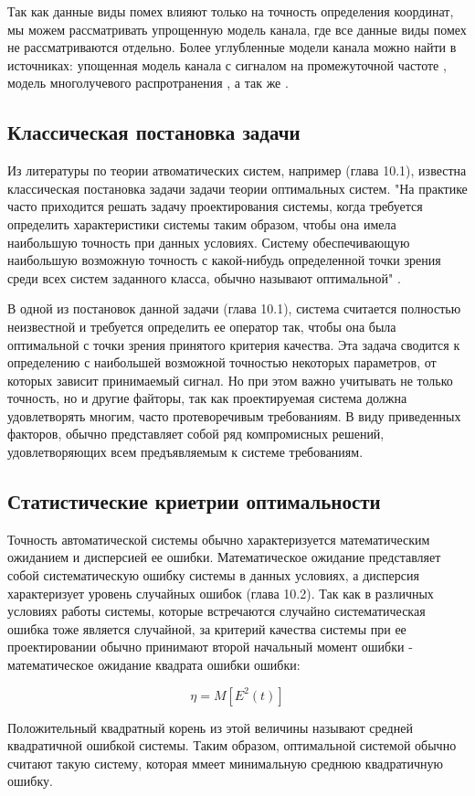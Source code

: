 Так как данные виды помех влияют только на точность определения координат, мы можем рассматривать упрощенную модель
канала, где все данные виды помех не рассматриваются отдельно. Более углубленные модели канала можно найти в
источниках: упощенная модель канала с сигналом на промежуточной частоте \cite{lei_dong_phd}, модель многолучевого
распротранения \cite{hannah_phd}, а так же \cite{burns_model, corbell_model, crs_model, brown_model}.
 
\subsection{Классическая постановка задачи}
\label{sec1_FIXME}

Из литературы по теории атвоматических систем, например \cite{pugachev} (глава 10.1), известна классическая постановка
задачи задачи теории оптимальных систем. "На практике часто приходится решать задачу проектирования системы, когда
требуется определить характеристики системы таким образом, чтобы она имела наибольшую точность при данных условиях.
Систему обеспечивающую наибольшую возможную точность с какой-нибудь определенной точки зрения среди всех систем
заданного класса, обычно называют оптимальной" \cite{pugachev}.

В одной из постановок данной задачи \cite{pugachev} (глава 10.1), система считается полностью неизвестной
и требуется определить ее оператор так, чтобы она была оптимальной с точки зрения принятого критерия качества. Эта
задача сводится к определению с наибольшей возможной точностью некоторых параметров, от которых зависит принимаемый
сигнал. Но при этом важно учитывать не только точность, но и другие файторы, так как проектируемая система должна
удовлетворять многим, часто протеворечивым требованиям. В виду приведенных факторов, обычно представляет собой
ряд компромисных решений, удовлетворяющих всем предъявляемым к системе требованиям.

\subsection{Статистические криетрии оптимальности}
Точность автоматической системы обычно характеризуется математическим ожиданием и дисперсией ее ошибки.
Математическое ожидание представляет собой систематическую ошибку системы в данных условиях, а дисперсия
характеризует уровень случайных ошибок \cite{pugachev} (глава 10.2). Так как в различных условиях работы
системы, которые встречаются случайно систематическая ошибка тоже является случайной, за критерий качества
системы при ее проектировании обычно принимают второй начальный момент ошибки - математическое ожидание
квадрата ошибки ошибки:
\begin{center}
\begin{equation}
	\label{eq:stat_err_prob}
	\eta = M[E^2(t)]
\end{equation}
\end{center}
Положительный квадратный корень из этой величины называют средней квадратичной ошибкой системы. Таким образом,
оптимальной системой обычно считают такую систему, которая ммеет минимальную среднюю квадратичную ошибку.

